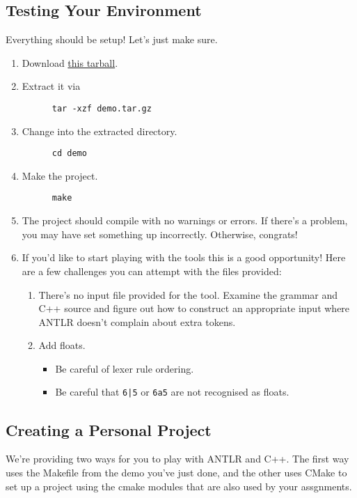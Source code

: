 \documentclass[../setup.tex]{subfiles}
\begin{document}
\subsection{Testing Your Environment}
Everything should be setup! Let's just make sure.
\begin{enumerate}
  \item
    Download \href{https://webdocs.cs.ualberta.ca/\%7Ec415/setup/static/demo.tar.gz} {this
    tarball}.
  \item
    Extract it via
    \begin{lstlisting}
      tar -xzf demo.tar.gz
    \end{lstlisting}
  \item
    Change into the extracted directory.
    \begin{lstlisting}
      cd demo
    \end{lstlisting}
  \item
    Make the project.
    \begin{lstlisting}
      make
    \end{lstlisting}
  \item
    The project should compile with no warnings or errors. If there's a problem, you may have set
    something up incorrectly. Otherwise, congrats!
  \item
    If you'd like to start playing with the tools this is a good opportunity! Here are a few
    challenges you can attempt with the files provided:
    \begin{enumerate}
      \item
        There's no input file provided for the tool. Examine the grammar and C++ source and
        figure out how to construct an appropriate input where ANTLR doesn't complain about extra
        tokens.
      \item
        Add floats.
        \begin{itemize}
          \item Be careful of lexer rule ordering.
          \item Be careful that \lstinline{6|5} or \lstinline{6a5} are not recognised as floats.
        \end{itemize}
    \end{enumerate}
\end{enumerate}

\subsection{Creating a Personal Project}
We're providing two ways for you to play with ANTLR and C++. The first way uses the Makefile from
the demo you've just done, and the other uses CMake to set up a project using the cmake modules
that are also used by your assgnments.
\end{document}
